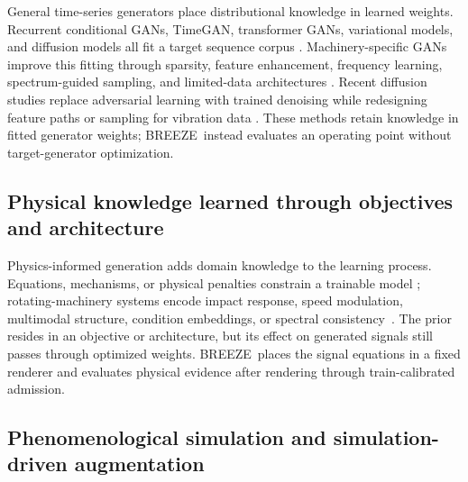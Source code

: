 \documentclass[a4paper,fleqn]{cas-sc}
\newcommand{\breeze}{BREEZE}
\begin{document}
General time-series generators place distributional knowledge in learned
weights. Recurrent conditional GANs, TimeGAN, transformer GANs, variational
models, and diffusion models all fit a target sequence corpus
\citep{esteban2017rcgan,yoon2019timegan,li2022ttsgan,li2022ttscgan,
liao2020sigcwgan,desai2021timevae,nichol2021improved,tashiro2021csdi,
alcaraz2022sssd,rasul2021timegrad}. Machinery-specific GANs
improve this fitting through sparsity, feature enhancement, frequency learning,
spectrum-guided sampling, and limited-data architectures
\citep{ma2021scgan,liu2022dfegan,ko2023flgn,kim2024sgan,lin2025fillinggan}.
Recent diffusion studies replace adversarial learning with trained denoising
while redesigning feature paths or sampling for vibration data
\citep{yi2024tsdm,yu2024refddpm,yang2024ddpmaugmentation,
xu2025faultdiffusion,tong2026acsdm}. These methods retain knowledge in fitted
generator weights; \breeze\ instead evaluates an operating point without
target-generator optimization.

\subsection{Physical knowledge learned through objectives and architecture}

Physics-informed generation adds domain knowledge to the learning process.
Equations, mechanisms, or physical penalties constrain a trainable model
\citep{raissi2019pinn}; rotating-machinery systems encode impact response,
speed modulation, multimodal structure, condition embeddings, or spectral
consistency~\citep{gao2025physicsgan,liu2026physicsdiffusion,guo2025diffucd,
xu2026mrddim}. The prior resides in an objective or architecture, but its effect
on generated signals still passes through optimized weights. \breeze\ places
the signal equations in a fixed renderer and evaluates physical evidence after
rendering through train-calibrated admission.

\subsection{Phenomenological simulation and simulation-driven augmentation}
\end{document}
